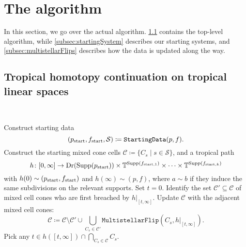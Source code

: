 \section{The algorithm}\label{sec:algorithm}
In this section, we go over the actual algorithm. \cref{subsec:homotopyContinuation} contains the top-level algorithm, while \cref{subsec:startingSystem} describes our starting systems, and \cref{subsec:multistellarFlips} describes how the data is updated along the way.

\subsection{Tropical homotopy continuation on tropical linear spaces}\label{subsec:homotopyContinuation}

\begin{algorithm}\
  \begin{algorithmic}[1]
    \STATE Construct starting data
    \[ (p_\start,f_\start,\mathcal S)\coloneqq\mathtt{StartingData}(p,f). \vspace{-1em} \]
    \STATE Construct the starting mixed cone cells $\mathcal C\coloneqq\{C_s\mid s\in\mathcal S\}$,
    and a tropical path
    \[ h\colon [0,\infty]\rightarrow \operatorname{Dr}(\operatorname{Supp}(p_{\mathrm{start}}))\times \mathbb{T}^{\operatorname{Supp}(f_{{\mathrm{start}},1})}\times\dots\times \mathbb{T}^{\operatorname{Supp}(f_{{\mathrm{start}},k})} \]
    with $h(0)\sim(p_{\mathrm{start}},f_{\mathrm{start}})$ and $h(\infty)\sim(p,f)$, where $a\sim b$ if they induce the same subdivisions on the relevant supports.
    \STATE Set $t=0$.
    \STATE Identify the set $\mathcal C'\subseteq\mathcal C$ of mixed cell cones who are first breached by $h|_{[t,\infty]}$.
    \STATE Update $\mathcal C$ with the adjacent mixed cell cones:
    \[ \mathcal C\coloneqq \mathcal C\setminus \mathcal C' \cup \bigcup_{C_s\in\mathcal C'} \mathtt{MultistellarFlip}(C_s,h|_{[t,\infty]}). \]
    \STATE Pick any $t\in h([t,\infty])\cap \bigcap_{C_s\in \mathcal C}C_s$.
    \ENDWHILE
  \end{algorithmic}
\end{algorithm}

